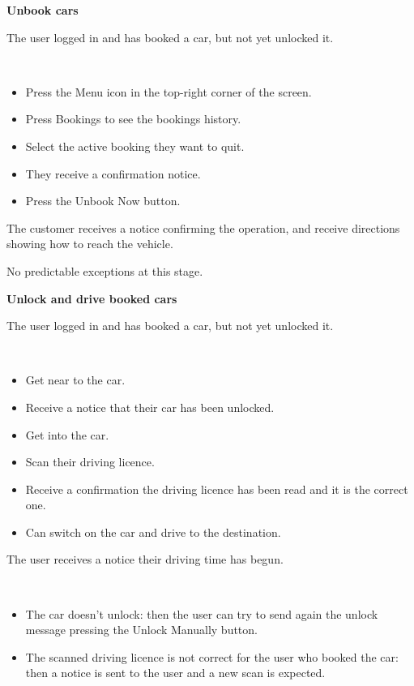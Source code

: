 \documentclass[11pt]{article} %
\begin{document}
\begin{description}[noitemsep,topsep=0pt,parsep=0pt,partopsep=0pt]
	\item[Name:] \textbf{Unbook cars}
	\item[Entry Conditions:] The user logged in and has booked a car, but not yet unlocked it.
	\item[Flow Of Events:] \hfill\
	\begin{itemize}
		\item Press the Menu icon in the top-right corner of the screen.
		\item Press Bookings to see the bookings history.
		\item Select the active booking they want to quit.
		\item They receive a confirmation notice.
		\item Press the Unbook Now button.
	\end{itemize}
	\item[Exit conditions:] The customer receives a notice confirming the operation, and receive directions showing how to reach the vehicle.
	\item[Exceptions:] No predictable exceptions at this stage.
\end{description}

\begin{description}[noitemsep,topsep=0pt,parsep=0pt,partopsep=0pt]
	\item[Name:] \textbf{Unlock and drive booked cars}
	\item[Entry Conditions:] The user logged in and has booked a car, but not yet unlocked it.
	\item[Flow Of Events:] \hfill\
	\begin{itemize}
		\item Get near to the car.
		\item Receive a notice that their car has been unlocked.
		\item Get into the car.
		\item Scan their driving licence.
		\item Receive a confirmation the driving licence has been read and it is the correct one.
		\item Can switch on the car and drive to the destination.
	\end{itemize}
	\item[Exit conditions:]  The user receives a notice their driving time has begun.
	\item[Exceptions:] \hfill\
	\begin{itemize}
		\item The car doesn't unlock: then the user can try to send again the unlock message pressing the Unlock Manually button.
		\item The scanned driving licence is not correct for the user who booked the car: then a notice is sent to the user and a new scan is expected.
	\end{itemize}
\end{description}
\end{document}

